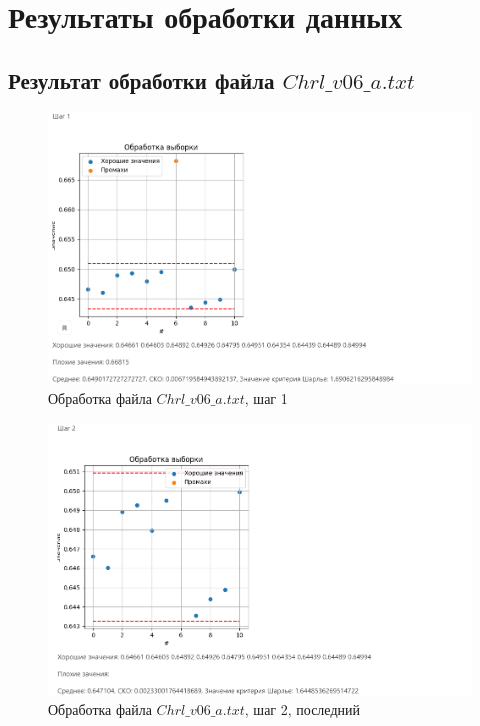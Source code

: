 \documentclass[a4paper,14pt]{article}
\begin{document}
\section{Результаты обработки данных}

	
		
	\subsection{Результат обработки файла $Chrl\_v06\_a.txt$}
	
	\begin{figure}[H]
		\centering
		\includegraphics[width=0.95\linewidth]{images/a_1}
		\caption{Обработка файла $Chrl\_v06\_a.txt$, шаг 1}
		\label{fig:a_1}
	\end{figure}
	
	
	\begin{figure}[H]
		\centering
		\includegraphics[width=0.95\linewidth]{images/a_2}
		\caption{Обработка файла $Chrl\_v06\_a.txt$, шаг 2, последний}
		\label{fig:a_2}
	\end{figure}
	
\end{document}
